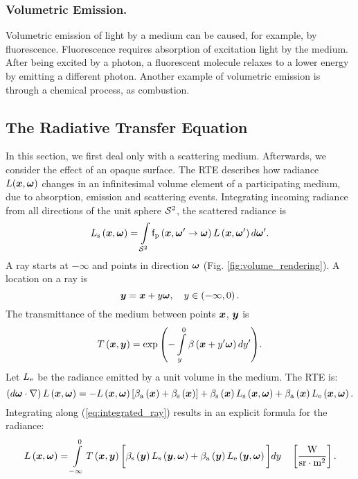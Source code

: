 \documentclass{article}
\begin{document}
\subsubsection{Volumetric Emission.}
Volumetric emission of light by a medium can be caused, for example, by fluorescence. Fluorescence requires absorption of excitation light by the medium. After being excited by a photon, a fluorescent molecule relaxes to a lower energy by emitting a different photon. Another example of volumetric emission is through a chemical process, as combustion.

\subsection{The Radiative Transfer Equation}
In this section, we first deal only with a scattering medium. Afterwards, we consider the effect of an opaque surface. The \ac{RTE} describes how radiance $L(\boldsymbol{x},\boldsymbol{\omega})$ changes in an infinitesimal volume element of a participating medium, due to absorption, emission and scattering events. Integrating incoming radiance from all directions of the unit sphere $\mathcal{S}^2$, the scattered radiance is
\begin{equation}
\label{eq:inscattered_radiance}
\radiancesat = \intop_{\sphere}{\phasefunc\regpar{\location,\direction'\rightarrow\direction} \radiance\regpar{\location,\direction'} d\direction'}.
\end{equation}
A ray starts at $-\infty$ and points in direction $\boldsymbol{\omega}$ (Fig. \ref{fig:volume_rendering}). A location on a ray is
\begin{equation}
\label{eq:integrated_ray}
\boldsymbol{y} = \boldsymbol{x} + y\boldsymbol{\omega},  \quad  y\in\left(-\infty, 0\right).
\end{equation}
 The transmittance of the medium between points $\boldsymbol{x}$, $\boldsymbol{y}$ is
\begin{equation}
\label{eq:transmittance}
\trans{\location}{\locationb} = \exp{\regpar{-\intop_{\locb}^0{\extt\regpar{\location+\locb'\direction}d\locb'}}}.
\end{equation} 
Let $L_{\text{e}}$ be the radiance emitted by a unit volume in the medium. The \ac{RTE} is:
\begin{equation}
\label{eq:RTE}
\left({d\boldsymbol{\omega}\cdot\nabla}\right)L\left({\boldsymbol{x},\boldsymbol{\omega}}\right) = -L\left({\boldsymbol{x},\boldsymbol{\omega}}\right)\left[{\beta_{\text{a}}\left({\boldsymbol{x}}\right) + \beta_{\text{s}}\left({\boldsymbol{x}}\right)}\right] +\beta_{\text{s}}\left({\boldsymbol{x}}\right)L_{\text{s}}\left({\boldsymbol{x},\boldsymbol{\omega}}\right) + \beta_{\text{a}}\left({\boldsymbol{x}}\right)L_{\text{e}}\left({\boldsymbol{x},\boldsymbol{\omega}}\right) .
\end{equation}
Integrating \eq{\ref{eq:RTE}} along (\ref{eq:integrated_ray}) results in an explicit formula for the radiance:
\begin{equation}
\label{eq:integrated_RTE}
\radianceat = \intop_{-\infty}^0{\trans{\location}{\locationb}\bigg[\exts\regpar{\locationb}\radiances\regpar{\locationb,\direction}} + \exta\regpar{\locationb}\radiancee\regpar{\locationb,\direction} \bigg]d\locb\quad \squarepar{\frac{\text{W}}{\text{sr}\cdot\text{m}^{2}}}.
\end{equation}
 
\end{document}
